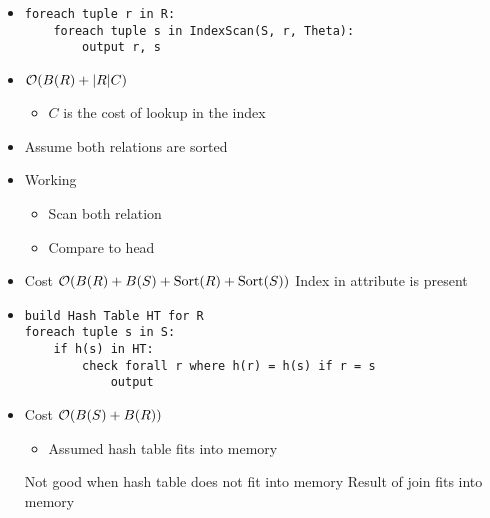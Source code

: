 \begin{itemize}
\begin{itemize}
                \begin{itemize}
                    \item
\begin{verbatim}
foreach tuple r in R:
    foreach tuple s in IndexScan(S, r, Theta):
        output r, s
\end{verbatim}
                    \item $\mathcal{O}(B(R) + |R| C)$
                        \begin{itemize}
                            \item $C$ is the cost of lookup in the index
                        \end{itemize}
                \end{itemize}
                \begin{itemize}
                    \item Assume both relations are sorted
                    \item Working
                        \begin{itemize}
                            \item Scan both relation
                            \item Compare to head
                        \end{itemize}
                    \item Cost $\mathcal{O}(B(R) + B(S) + \text{Sort}(R) + \text{Sort}(S))$
                     Index in attribute is present
                \end{itemize}
                \begin{itemize}
                    \item
\begin{verbatim}
build Hash Table HT for R
foreach tuple s in S:
    if h(s) in HT:
        check forall r where h(r) = h(s) if r = s
            output
\end{verbatim}
                    \item Cost $\mathcal{O}(B(S) + B(R))$
                        \begin{itemize}
                            \item Assumed hash table fits into memory
                        \end{itemize}
                    \icon Not good when hash table does not fit into memory
                     Result of join fits into memory
                \end{itemize}

\end{itemize}
\end{itemize}
